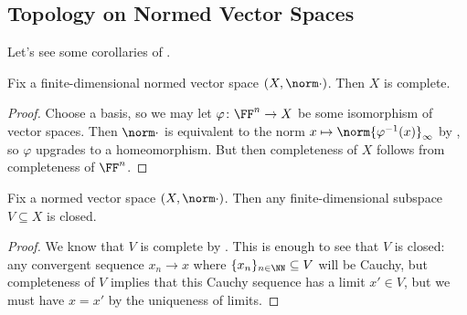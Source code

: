 \documentclass[../notes.tex]{subfiles}
\begin{document}
\subsection{Topology on Normed Vector Spaces}
Let's see some corollaries of .
\begin{corollary} \label{cor:fin-dim-complete}
	Fix a finite-dimensional normed vector space $(X,\norm\cdot)$. Then $X$ is complete.
\end{corollary}
\begin{proof}
	Choose a basis, so we may let $\varphi\colon\FF^n\to X$ be some isomorphism of vector spaces. Then $\norm\cdot$ is equivalent to the norm $x\mapsto\norm{\varphi^{-1}(x)}_\infty$ by , so $\varphi$ upgrades to a homeomorphism. But then completeness of $X$ follows from completeness of $\FF^n$.
\end{proof}
\begin{corollary} \label{cor:fin-dim-is-closed}
	Fix a normed vector space $(X,\norm\cdot)$. Then any finite-dimensional subspace $V\subseteq X$ is closed.
\end{corollary}
\begin{proof}
	We know that $V$ is complete by . This is enough to see that $V$ is closed: any convergent sequence $x_n\to x$ where $\{x_n\}_{n\in\NN}\subseteq V$ will be Cauchy, but completeness of $V$ implies that this Cauchy sequence has a limit $x'\in V$, but we must have $x=x'$ by the uniqueness of limits.
\end{proof}
\end{document}
